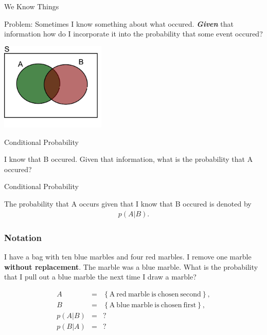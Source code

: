 \begin{frame}{We Know Things}

  Problem: Sometimes I know something about what
  occured. \textit{\textbf{Given}} that information how do I
  incorporate it into the probability that some event occured?

  \vfill
  \centerline{\includegraphics[width=5cm]{img/vennDiagram}}
  \vfill
  
\end{frame}



\begin{frame}{Conditional Probability}

  I know that B occured. Given that information, what is the
  probability that A occured?

  \begin{definition}{Conditional Probability}

    The probability that A occurs given that I know that B occured is
    denoted by
    \begin{eqnarray*}
      p(A|B).
    \end{eqnarray*}
    
  \end{definition}
  
\end{frame}


\begin{frame}
  \frametitle{Notation}

  I have a bag with ten blue marbles and four red marbles. I remove
  one marble \textbf{without replacement}. The marble was a blue
  marble. What is the probability that I pull out a blue marble the
  next time I draw a marble?

  \vfill

  \begin{eqnarray*}
    A & = & \left\{ \mathrm{A~red~marble~is~chosen~second} \right\}, \\
    B & = & \left\{ \mathrm{A~blue~marble~is~chosen~first} \right\}, \\
    p(A|B) & = & ? \\
    p(B|A) & = & ?
  \end{eqnarray*}

  \vfill

\end{frame}






